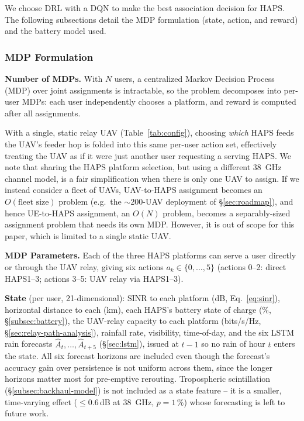 \documentclass[]{ieeeaccess}
\begin{document}
We choose DRL with a DQN to make the best association decision for HAPS. The following subsections detail the MDP formulation (state, action, and reward) and the battery model used.

\subsubsection{MDP Formulation}

\textbf{Number of MDPs.} With $N$ users, a centralized Markov Decision Process (MDP) over joint assignments is intractable, so the problem decomposes into per-user MDPs: each user independently chooses a platform, and reward is computed after all assignments.

With a single, static relay UAV (Table~\ref{tab:config}), choosing \emph{which} HAPS feeds the UAV's feeder hop is folded into this same per-user action set, effectively treating the UAV as if it were just another user requesting a serving HAPS. We note that sharing the HAPS platform selection, but using a different 38~GHz channel model, is a fair simplification when there is only one UAV to assign. If we instead consider a fleet of UAVs, UAV-to-HAPS assignment becomes an $O(\text{fleet size})$ problem (e.g.\ the $\sim$200-UAV deployment of \S\ref{sec:roadmap}), and hence UE-to-HAPS assignment, an $O(N)$ problem, becomes a separably-sized assignment problem that needs its own MDP. However, it is out of scope for this paper, which is limited to a single static UAV.

\textbf{MDP Parameters.} Each of the three HAPS platforms can serve a user directly or through the UAV relay, giving six actions $a_k\in\{0,\dots,5\}$ (actions 0--2: direct HAPS1--3; actions 3--5: UAV relay via HAPS1--3).

\textbf{State} (per user, 21-dimensional): SINR to each platform (dB, Eq.~\eqref{eq:sinr}), horizontal distance to each (km), each HAPS's battery state of charge (\%, \S\ref{subsec:battery}), the UAV-relay capacity to each platform (bits/s/Hz, \S\ref{sec:relay-path-analysis}), rainfall rate, visibility, time-of-day, and the six LSTM rain forecasts $\hat{A}_t,\dots,\hat{A}_{t+5}$ (\S\ref{sec:lstm}), issued at $t-1$ so no rain of hour $t$ enters the state. All six forecast horizons are included even though the forecast's accuracy gain over persistence is not uniform across them, since the longer horizons matter most for pre-emptive rerouting. Tropospheric scintillation (\S\ref{subsec:backhaul-model}) is not included as a state feature -- it is a smaller, time-varying effect ($\le$0.6\,dB at 38~GHz, $p=1\,\%$) whose forecasting is left to future work.
\end{document}
